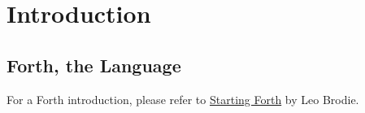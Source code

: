 \chapter{Introduction}

\section{Forth, the Language}

For a Forth introduction, please refer to \href{http://www.forth.com/starting-forth/}{Starting Forth} by Leo Brodie.
